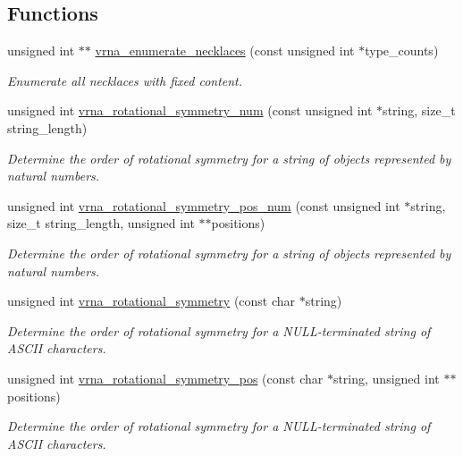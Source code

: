 \subsection*{Functions}
\begin{DoxyCompactItemize}
\item 
unsigned int $\ast$$\ast$ \mbox{\hyperlink{group__combinatorics__utils_gae081ac655a76bd5c4b3d86c60b096b75}{vrna\+\_\+enumerate\+\_\+necklaces}} (const unsigned int $\ast$type\+\_\+counts)
\begin{DoxyCompactList}\small\item\em Enumerate all necklaces with fixed content. \end{DoxyCompactList}\item 
unsigned int \mbox{\hyperlink{group__combinatorics__utils_gac51464b5281833a58c25f9447252c495}{vrna\+\_\+rotational\+\_\+symmetry\+\_\+num}} (const unsigned int $\ast$string, size\+\_\+t string\+\_\+length)
\begin{DoxyCompactList}\small\item\em Determine the order of rotational symmetry for a string of objects represented by natural numbers. \end{DoxyCompactList}\item 
unsigned int \mbox{\hyperlink{group__combinatorics__utils_ga95b5a6ac35da982e2a766f8d2f98a2e1}{vrna\+\_\+rotational\+\_\+symmetry\+\_\+pos\+\_\+num}} (const unsigned int $\ast$string, size\+\_\+t string\+\_\+length, unsigned int $\ast$$\ast$positions)
\begin{DoxyCompactList}\small\item\em Determine the order of rotational symmetry for a string of objects represented by natural numbers. \end{DoxyCompactList}\item 
unsigned int \mbox{\hyperlink{group__combinatorics__utils_gae1dec02c4b63f303ce06a9293d316762}{vrna\+\_\+rotational\+\_\+symmetry}} (const char $\ast$string)
\begin{DoxyCompactList}\small\item\em Determine the order of rotational symmetry for a N\+U\+L\+L-\/terminated string of A\+S\+C\+II characters. \end{DoxyCompactList}\item 
unsigned int \mbox{\hyperlink{group__combinatorics__utils_ga294d48935fcac87ab335d771fe289ecb}{vrna\+\_\+rotational\+\_\+symmetry\+\_\+pos}} (const char $\ast$string, unsigned int $\ast$$\ast$positions)
\begin{DoxyCompactList}\small\item\em Determine the order of rotational symmetry for a N\+U\+L\+L-\/terminated string of A\+S\+C\+II characters. \end{DoxyCompactList}\item 
$$
\end{DoxyCompactItemize}

